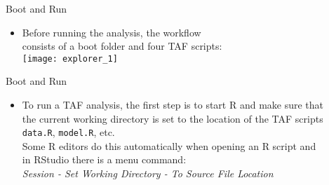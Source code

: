 \documentclass[aspectratio=169]{beamer}
\begin{document}

\begin{frame}{Boot and Run}\small
  \begin{itemize}
    \item[] Before running the analysis, the workflow\\[0.2ex]
    consists of a boot folder and four TAF scripts:\\[2ex]
    \qquad\texttt{[image: explorer\_1]}
  \end{itemize}
\end{frame}


\begin{frame}{Boot and Run}\small
  \begin{itemize}
    \item[] To run a TAF analysis, the first step is to start R and make sure
    that\\
    the {\green current working directory} is set to the location of the TAF
    scripts\\
    {\tt data.R}, {\tt model.R}, etc.\\[4ex]
    Some R editors do this automatically when opening an R script and\\
    in RStudio there is a menu command:\\[1ex]\it
    \qquad Session - Set Working Directory - To Source File Location\\[2ex]
    \green\sf\qquad[\:\!Alt-s w s\;\!]
  \end{itemize}
\end{frame}

\end{document}

